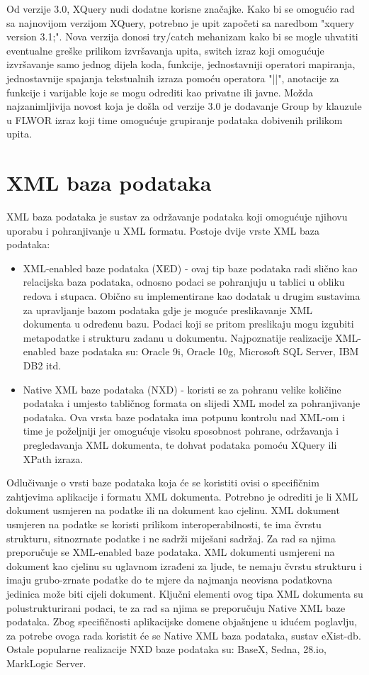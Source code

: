 \documentclass{foi}
\begin{document}
Od verzije 3.0, XQuery nudi dodatne korisne značajke. Kako bi se omogućio rad sa najnovijom verzijom XQuery, potrebno je upit započeti sa naredbom "xquery version 3.1;". Nova verzija donosi try/catch mehanizam kako bi se mogle uhvatiti eventualne greške prilikom izvršavanja upita, switch izraz koji omogućuje izvršavanje samo jednog dijela koda, funkcije, jednostavniji operatori mapiranja, jednostavnije spajanja tekstualnih izraza pomoću operatora "||", anotacije za funkcije i varijable koje se mogu odrediti kao privatne ili javne. Možda najzanimljivija novost koja je došla od verzije 3.0 je dodavanje Group by klauzule u FLWOR izraz koji time omogućuje grupiranje podataka dobivenih prilikom upita. \cite{exist}

\chapter{XML baza podataka}

XML baza podataka je sustav za održavanje podataka koji omogućuje njihovu uporabu i pohranjivanje u XML formatu. Postoje dvije vrste XML baza podataka:
\begin{itemize}
\item XML-enabled baze podataka (XED) - ovaj tip baze podataka radi slično kao relacijska baza podataka, odnosno podaci se pohranjuju u tablici u obliku redova i stupaca. Obično su implementirane kao dodatak u drugim sustavima za upravljanje bazom podataka gdje je moguće preslikavanje XML dokumenta u određenu bazu. Podaci koji se pritom preslikaju mogu izgubiti metapodatke i strukturu zadanu u dokumentu. Najpoznatije realizacije XML-enabled baze podataka su: Oracle 9i, Oracle 10g, Microsoft SQL Server, IBM DB2 itd.
\item Native XML baze podataka (NXD) - koristi se za pohranu velike količine podataka i umjesto tabličnog formata on slijedi XML model za pohranjivanje podataka. Ova vrsta baze podataka ima potpunu kontrolu nad XML-om i time je poželjniji jer omogućuje visoku sposobnost pohrane, održavanja i pregledavanja XML dokumenta, te dohvat podataka pomoću XQuery ili XPath izraza.
\end{itemize}

Odlučivanje o vrsti baze podataka koja će se koristiti ovisi o specifičnim zahtjevima aplikacije i formatu XML dokumenta. Potrebno je odrediti je li XML dokument usmjeren na podatke ili na dokument kao cjelinu. XML dokument usmjeren na podatke se koristi prilikom interoperabilnosti, te ima čvrstu strukturu, sitnozrnate podatke i ne sadrži miješani sadržaj. Za rad sa njima preporučuje se XML-enabled baze podataka. XML dokumenti usmjereni na dokument kao cjelinu su uglavnom izrađeni za ljude, te nemaju čvrstu strukturu i imaju grubo-zrnate podatke do te mjere da najmanja neovisna podatkovna jedinica može biti cijeli dokument. Ključni elementi ovog tipa XML dokumenta su polustrukturirani podaci, te za rad sa njima se preporučuju Native XML baze podataka. \cite{xmlDatabase} Zbog specifičnosti aplikacijske domene objašnjene u idućem poglavlju, za potrebe ovoga rada koristit će se Native XML baza podataka, sustav eXist-db. Ostale popularne realizacije NXD baze podataka su: BaseX, Sedna, 28.io, MarkLogic Server. 
\end{document}
